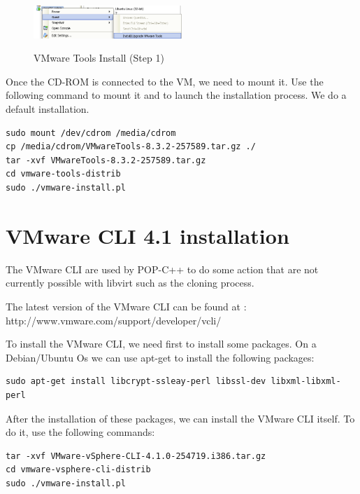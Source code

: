 \begin{figure}[ht]
	\caption{VMware Tools Install (Step 1) }
  	\centering
	\includegraphics[width=0.5\textwidth]{./pic/vmwaretools_1.png}
	\label{fig:vmwaretoolsinstall1}
\end{figure}

Once the CD-ROM is connected to the VM, we need to mount it. Use the following command to mount it and to launch the installation process. We do a default installation. \s

\begin{lstlisting}
sudo mount /dev/cdrom /media/cdrom
cp /media/cdrom/VMwareTools-8.3.2-257589.tar.gz ./
tar -xvf VMwareTools-8.3.2-257589.tar.gz
cd vmware-tools-distrib
sudo ./vmware-install.pl
\end{lstlisting}





\section{VMware CLI 4.1 installation}
\label{app:vmwarecli}

The VMware CLI are used by POP-C++ to do some action that are not currently possible with libvirt such as the cloning process. \s

The latest version of the VMware CLI can be found at : http://www.vmware.com/support/developer/vcli/ \s

To install the VMware CLI, we need first to install some packages. On a Debian/Ubuntu Os we can use apt-get to install the following packages: \s

\begin{lstlisting}
sudo apt-get install libcrypt-ssleay-perl libssl-dev libxml-libxml-perl
\end{lstlisting}

After the installation of these packages, we can install the VMware CLI itself. To do it, use the following commands:\s

\begin{lstlisting}
tar -xvf VMware-vSphere-CLI-4.1.0-254719.i386.tar.gz
cd vmware-vsphere-cli-distrib
sudo ./vmware-install.pl
\end{lstlisting}\s


